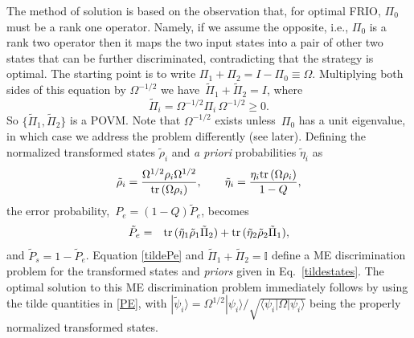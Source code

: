 \documentclass[aps,pra,twocolumn,eqsecnum,showpacs]{revtex4}
\newcommand{\id}{{\mathbb I}}
\newcommand{\tr}{{\rm tr}\,}
\begin{document}
The method of solution is based on the observation that, for optimal FRIO, $\Pi_{0}$ must be a rank one operator. Namely, if we assume the opposite, i.e., $\Pi_{0}$ is a rank two operator then it maps the two input states into a pair of other two states that can be further discriminated, contradicting that the strategy is optimal. The starting point is to write $\Pi_1+\Pi_2 = I - \Pi_0 \equiv \Omega$. Multiplying both sides of this equation by 
$\Omega^{-1/2}$  we have~$\tilde\Pi_1+\tilde\Pi_2 = I$,
where
\begin{equation}
\tilde\Pi_i=\Omega^{-1/2}\Pi_i \,\Omega^{-1/2}\ge0 .
\label{tildeops}
\end{equation}
So $\{\tilde\Pi_1,\tilde\Pi_2\}$ is a POVM.
Note that $\Omega^{-1/2}$ exists unless~$\Pi_0$ has a unit eigenvalue, in which case we address the problem differently (see later).
Defining the normalized transformed states $\tilde\rho_i$ and  \emph{a priori} probabilities $\tilde\eta_i$ as
\begin{equation}
\tilde\rho_i=\frac{\Omega^{1/2}\rho_i\Omega^{1/2}} {\tr(\Omega\rho_i)} ,  \qquad  \tilde\eta_i=\frac{\eta_i\tr(\Omega\rho_i)}{1-Q},
\label{tildestates}
\end{equation}
the error probability,~$P_{e}=(1-Q) \tilde P_{e}$, becomes 
\begin{eqnarray}
\tilde{P}_{e} &=& \tr(\tilde\eta_1\tilde\rho_1 \tilde\Pi_2)+\tr(\tilde\eta_2\tilde\rho_2 \tilde\Pi_1) ,
\label{tildePe}
\end{eqnarray}
and $\tilde{P}_{s} = 1 - \tilde{P}_{e}$. 
Equation \eqref{tildePe} and $\tilde\Pi_1+\tilde\Pi_2=\id$ define a ME discrimination problem for the transformed states and \emph{priors} given in Eq.~\eqref{tildestates}. The optimal solution to this ME discrimination problem immediately follows by using the tilde quantities in \eqref{PE}, with
$|\tilde\psi_i\rangle = \Omega^{1/2} |\psi_{i}\rangle /\sqrt{\langle\psi_{i}|\Omega|\psi_{i}\rangle}$ being the properly normalized transformed states.
  
\end{document}
